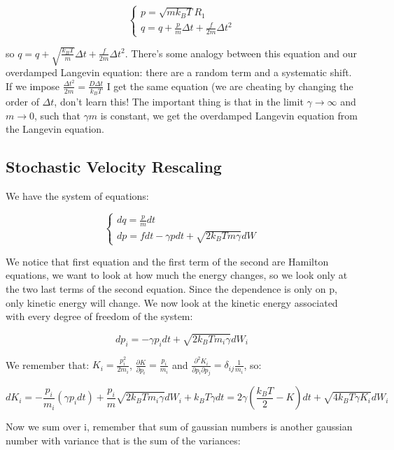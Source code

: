 \documentclass[a4paper, italian, openany]{book}
\begin{document}
$$\begin{cases}
p = \sqrt{m k_B T}R_1\\
q = q + \frac{p}{m} \Delta t + \frac{f}{2m} \Delta t^2
\end{cases}$$

so $q = q + \sqrt{\frac{k_B T}{m}} \Delta t + \frac{f}{2m} \Delta t^2$. There's some analogy between this equation and our overdamped Langevin equation: there are a random term and a systematic shift.\newline
If we impose $\frac{\Delta t^2}{2m} = \frac{D \Delta t}{k_B T}$ I get the same equation (we are cheating by changing the order of $\Delta t$, don't learn this!\newline
The important thing is that in the limit $\gamma \to \infty$ and $m \to 0$, such that $\gamma m$ is constant, we get the overdamped Langevin equation from the Langevin equation.

\subsection{Stochastic Velocity Rescaling}

We have the system of equations:

$$\begin{cases}
dq = \frac{p}{m} dt\\
dp = fdt - \gamma p dt + \sqrt{2 k_B T m \gamma} dW
\end{cases}$$

We notice that first equation and the first term of the second are Hamilton equations, we want to look at how much the energy changes, so we look only at the two last terms of the second equation. Since the dependence is only on p, only kinetic energy will change. We now look at the kinetic energy associated with every degree of freedom of the system:

$$dp_i = -\gamma p_i dt + \sqrt{2 k_B T m_i \gamma}dW_i$$

We remember that: $K_i = \frac{p_i^2}{2m_i}$, $\frac{\partial K}{\partial p_i}=\frac{p_i}{m_i}$ and $\frac{\partial^2 K_i}{\partial p_i \partial p_j} = \delta_{ij} \frac{1}{m_i}$, so:

$$dK_i = - \frac{p_i}{m_i}(\gamma p_i dt) + \frac{p_i}{m}\sqrt{2 k_B T m_i \gamma} dW_i + k_B T \gamma dt = 2\gamma \left ( \frac{k_B T}{2} -K \right )dt + \sqrt{4 k_B T \gamma K_i}dW_i$$

Now we sum over i, remember that sum of gaussian numbers is another gaussian number with variance that is the sum of the variances:
\end{document}
